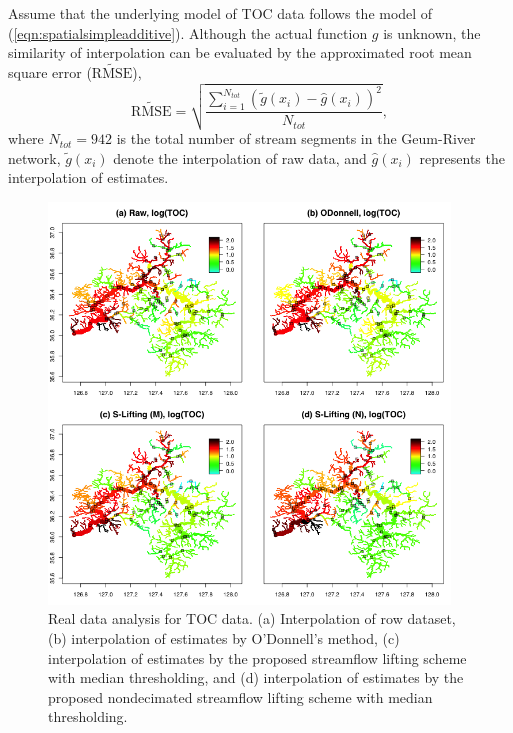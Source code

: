 \documentclass[11pt,titlepage]{article}
\begin{document}
Assume that the underlying model of TOC data follows the model of {\color{blue}(\ref{eqn:spatialsimpleadditive})}. Although the actual function $g$ is unknown, the similarity of interpolation can be evaluated by the approximated root mean square error ($\widetilde{\text{RMSE}}$),
\[
\widetilde{\text{RMSE}}=\sqrt{\frac{\sum_{i=1}^{N_{tot}} (\tilde{g}(x_i)-\hat{g}(x_i))^{2}} {N_{tot}}},
\]
where $N_{tot}=942$ is the total number of stream segments in the Geum-River network, $\tilde{g}(x_i)$ denote the interpolation of raw data, and $\hat{g}(x_i)$ represents the interpolation of estimates. 

\begin{figure}
	\centering\includegraphics[width=0.95\textwidth]{Stream_result/result_TOC3.png}
	\vspace{-3mm}
	\caption{Real data analysis for TOC data.  (a) Interpolation of row dataset, (b) interpolation of estimates by O'Donnell's method, (c) interpolation of estimates by the proposed streamflow lifting scheme with median thresholding, and (d) interpolation of estimates by the proposed nondecimated streamflow lifting scheme with median thresholding.}
	\label{fig:realanalysis}
\end{figure}
\end{document}
